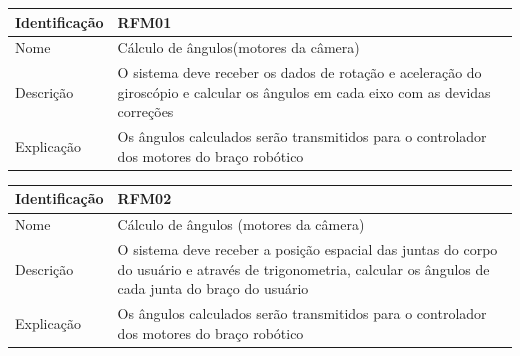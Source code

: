 				\begin{center}
				\begin{tabular}{ | l |  p{7cm} |}
					\hline
					Identificação & RFM01  \\ \hline
					Nome & Cálculo de ângulos(motores da câmera)\\ \hline
					Descrição & O sistema deve receber os dados de rotação e aceleração do giroscópio e calcular os ângulos em cada eixo com as devidas correções
					\\ \hline
					Explicação & Os ângulos calculados serão transmitidos para o controlador dos motores do braço robótico  
					\\ \hline
					
				\end{tabular}
			\end{center}


	\begin{center}
	\begin{tabular}{ | l |  p{7cm} |}
		\hline
		Identificação & RFM02  \\ \hline
		Nome & Cálculo de ângulos (motores da câmera)\\ \hline
		Descrição & O sistema deve receber a posição espacial das juntas do corpo do usuário e através de trigonometria, calcular os ângulos de cada junta do braço do usuário
		\\ \hline
		Explicação & Os ângulos calculados serão transmitidos para o controlador dos motores do braço robótico  
		\\ \hline
		
	\end{tabular}
\end{center}

